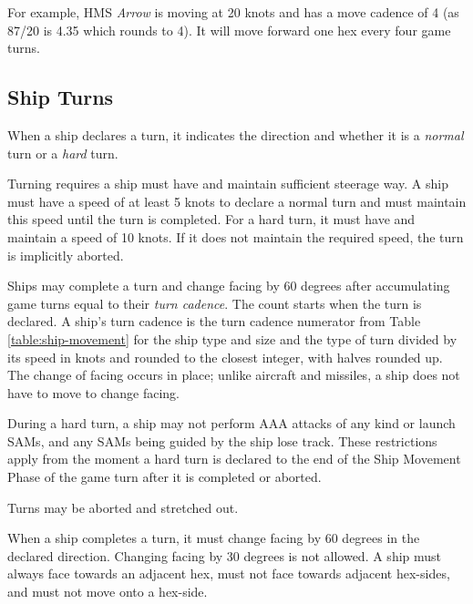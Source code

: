 {    For example, HMS {\itshape Arrow} is moving at 20 knots and has a move cadence of 4 (as 87/20 is 4.35 which rounds to 4). It will move forward one hex every four game turns.

    \subsection{Ship Turns}

    When a ship declares a turn, it indicates the direction and whether it is a \emph{normal} turn or a \emph{hard} turn.

    Turning requires a ship must have and maintain sufficient steerage way. A ship must have a speed of at least 5 knots to declare a normal turn and must maintain this speed until the turn is completed. For a hard turn, it must have and maintain a speed of 10 knots. If it does not maintain the required speed, the turn is implicitly aborted.

    Ships may complete a turn and change facing by 60 degrees after accumulating game turns equal to their \emph{turn cadence}. The count starts when the turn is declared. A ship's turn cadence is the turn cadence numerator from Table \ref{table:ship-movement} for the ship type and size and the type of turn divided by its speed in knots and rounded to the closest integer, with halves rounded up. The change of facing occurs in place; unlike aircraft and missiles, a ship does not have to move to change facing.

    During a hard turn, a ship may not perform AAA attacks of any kind or launch SAMs, and any SAMs being guided by the ship lose track. These restrictions apply from the moment a hard turn is declared to the end of the Ship Movement Phase of the game turn after it is completed or aborted.

    Turns may be aborted and stretched out.

    When a ship completes a turn, it must change facing by 60 degrees in the declared direction. Changing facing by 30 degrees is not allowed. A ship must always face towards an adjacent hex, must not face towards adjacent hex-sides, and must not move onto a hex-side.

    

}
